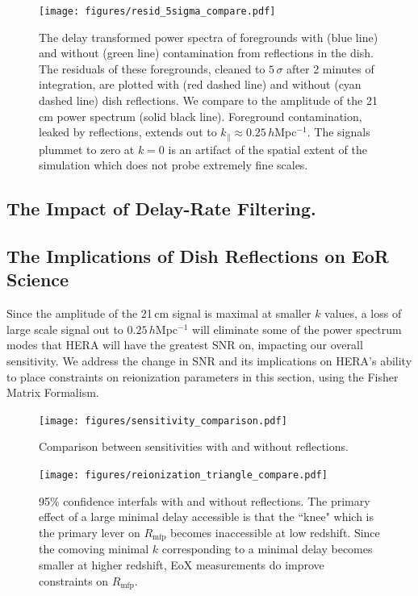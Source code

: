\documentclass[onecolumn]{emulateapj}
\begin{document}
\begin{figure}
\centering
\texttt{[image: figures/resid\_5sigma\_compare.pdf]}
\caption{The delay transformed power spectra of foregrounds with (blue line) and without (green line) contamination from reflections in the dish. The residuals of these foregrounds, cleaned to $5\,\sigma$ after 2 minutes of integration, are plotted with (red dashed line) and without (cyan dashed line) dish reflections. We compare to the amplitude of the 21\,cm power spectrum (solid black line). Foreground contamination, leaked by reflections, extends out to $k_\parallel \approx 0.25$\,$h$Mpc$^{-1}$. The signals plummet to zero at $k=0$ is an artifact of the spatial extent of the simulation which does not probe extremely fine scales.}
\label{fig:SignalCompare}
\end{figure}

\subsection{The Impact of Delay-Rate Filtering.}

\subsection{The Implications of Dish Reflections on EoR Science}
Since the amplitude of the 21\,cm signal is maximal at smaller $k$ values, a loss of large scale signal out to $0.25$\,$h$Mpc$^{-1}$ will eliminate some of the power spectrum modes that HERA will have the greatest SNR on, impacting our overall sensitivity. We address the change in SNR and its implications on HERA's ability to place constraints on reionization parameters in this section, using the Fisher Matrix Formalism. 



\begin{figure}
\texttt{[image: figures/sensitivity\_comparison.pdf]}
\caption{Comparison between sensitivities with and without reflections.}
\end{figure}


\begin{figure}
\texttt{[image: figures/reionization\_triangle\_compare.pdf]}
\caption{95\% confidence interfals with and without reflections. The primary effect of a large minimal delay accessible is that  the ``knee" which is the primary lever on $R_\text{mfp}$ becomes inaccessible at low redshift. Since the comoving minimal $k$ corresponding to a minimal delay becomes smaller at higher redshift, EoX measurements do improve constraints on $R_\text{mfp}$. }
\end{figure}
\end{document}
